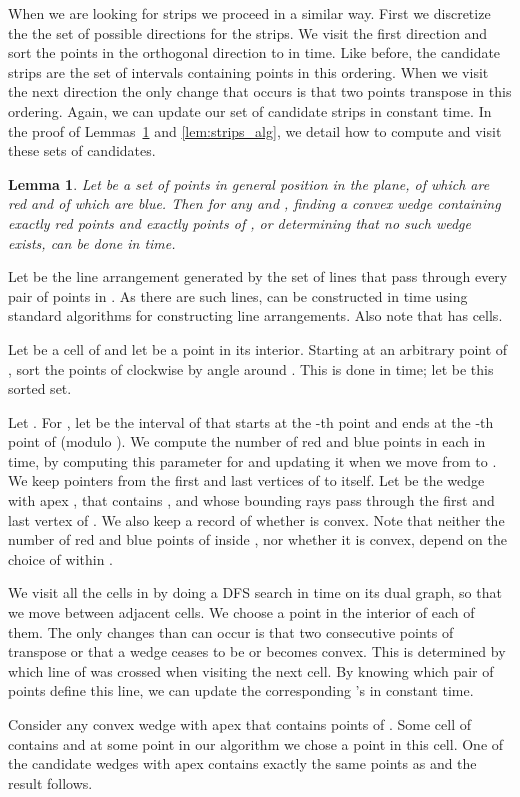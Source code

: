 \documentclass{article}
\newtheorem{lemma}[theorem]{Lemma}
\def\QED{\ensuremath{{\square}}}
\def\markatright#1{\leavevmode\unskip\nobreak\quad\hspace*{\fill}{#1}}
\newenvironment{proof}
  {\begin{trivlist}\item[\hskip\labelsep{\bf Proof.}]}
  {\markatright{\QED}\end{trivlist}}
\begin{document}
When we are looking for strips we proceed in a similar way.
First we discretize the the set of possible directions for the strips.
We visit the first direction  and sort the points in the orthogonal
direction to  in  time. Like before,
the candidate strips are the set of intervals containing  points in this
ordering. When we visit the next direction the only change that occurs is that 
two points transpose in this ordering. Again, we can update our set
of candidate strips in constant time. In the proof of 
Lemmas~\ref{lem:wedge_alg} and \ref{lem:strips_alg}, we detail how to compute
and visit these sets of candidates.


\begin{lemma}\label{lem:wedge_alg}
Let  be a set of  points in general position in the plane,  of which are red and  of which are blue.
Then for any  and , finding a convex wedge 
containing exactly  red points and exactly  
points of , or determining that no such wedge exists,
can be done in  time.
\end{lemma}
\begin{proof}

Let  be the line arrangement generated by the set of lines 
that pass through every pair of points in . As there are  such lines, 
 can be constructed in  time using standard
algorithms for constructing line arrangements. Also note that 
has  cells.

Let  be a cell of  and let  be 
a point in its interior. Starting at
an arbitrary point of , sort the points of  clockwise by angle around . 
 This is done in  time;
let  be this sorted set.

Let .
For , let  be the interval of 
that starts at the -th point and ends at the -th
point of  (modulo ). We compute the number of red and blue points in each 
in  time, by computing this parameter for  and updating it
when we move from  to .  We keep pointers from the first and last vertices
of  to itself. Let  be the wedge with apex , that contains , and
whose bounding rays pass through the first and last vertex of . We also keep
a record of whether  is convex. Note that neither the number of red and blue points of 
 inside , nor whether it is convex, depend on the choice of  within . 

We visit all the cells in  by doing a DFS search in
 time on its
dual graph, so that we move between adjacent cells. We choose
a point  in the interior of each of them. 
The only changes than can occur is that two consecutive
points of  transpose or that a wedge ceases to be or becomes convex.
This is determined by which line of  was crossed
when visiting the next cell. By knowing which pair of points define
this line,  we can update the corresponding 's in constant time.

Consider any convex wedge  with apex  that contains  points
of . Some cell of  contains
 and at some point in our algorithm we chose a point  in this cell. 
One of the candidate wedges  with apex  contains exactly the same 
points as  and the result follows.
\end{proof}
\end{document}

